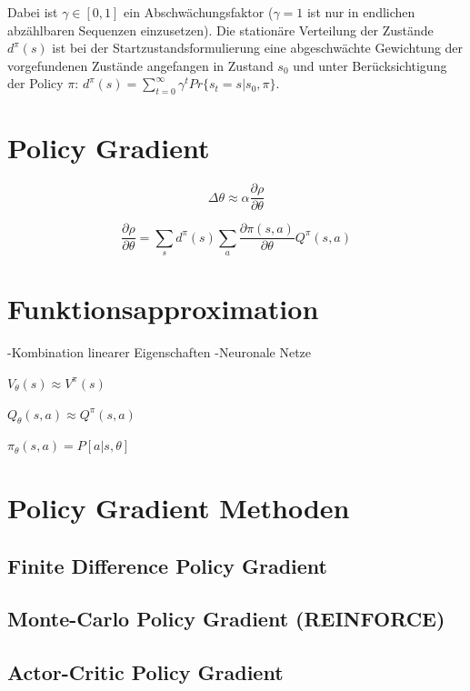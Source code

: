 \documentclass[conference]{IEEEtran}
\begin{document}
Dabei ist $\gamma \in [0,1]$ ein Abschwächungsfaktor ($\gamma = 1$ ist nur in endlichen abzählbaren Sequenzen einzusetzen). Die stationäre Verteilung der Zustände $d^\pi (s)$ ist bei der Startzustandsformulierung eine abgeschwächte Gewichtung der vorgefundenen Zustände angefangen in Zustand $s_0$ und unter Berücksichtigung der Policy $\pi$: $d^\pi (s) = \sum^\infty_{t=0} \gamma^t Pr \{s_t = s | s_0, \pi\}$.
 
\section{Policy Gradient}

\begin{equation}
\Delta \theta \approx \alpha \frac{\partial \rho}{\partial \theta}
\end{equation}

\begin{equation}
\frac{\partial \rho}{\partial \theta} = 
\sum_s d^\pi (s) \sum_a \frac{\partial \pi (s,a)}{\partial \theta} 
Q^\pi (s,a)
\end{equation}

\section{Funktionsapproximation}
-Kombination linearer Eigenschaften
-Neuronale Netze

$V_{\theta}(s) \approx V^{\pi}(s)$

$Q_{\theta}(s, a) \approx Q^{\pi}(s, a)$

$\pi_\theta (s,a) = P[a|s,\theta]$

\section{Policy Gradient Methoden}

\subsection{Finite Difference Policy Gradient}

\subsection{Monte-Carlo Policy Gradient (REINFORCE)}

\subsection{Actor-Critic Policy Gradient}
\end{document}
